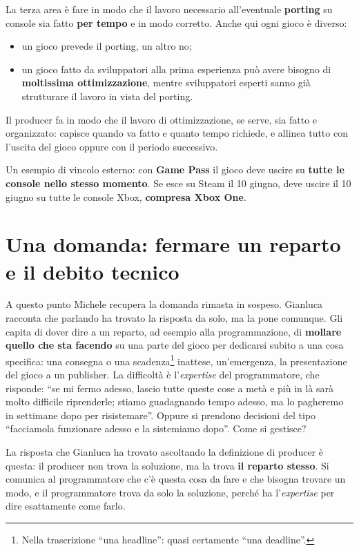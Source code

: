 La terza area è fare in modo che il lavoro necessario all'eventuale
\textbf{porting} su console sia fatto \textbf{per tempo} e in modo corretto.
Anche qui ogni gioco è diverso:
\begin{itemize}
  \item un gioco prevede il porting, un altro no;
  \item un gioco fatto da sviluppatori alla prima esperienza può avere bisogno
        di \textbf{moltissima ottimizzazione}, mentre sviluppatori esperti
        sanno già strutturare il lavoro in vista del porting.
\end{itemize}
Il producer fa in modo che il lavoro di ottimizzazione, se serve, sia fatto e
organizzato: capisce quando va fatto e quanto tempo richiede, e allinea tutto
con l'uscita del gioco oppure con il periodo successivo.

Un esempio di vincolo esterno: con \textbf{Game Pass} il gioco deve uscire su
\textbf{tutte le console nello stesso momento}. Se esce su Steam il 10 giugno,
deve uscire il 10 giugno su tutte le console Xbox, \textbf{compresa Xbox One}.

\section{Una domanda: fermare un reparto e il debito tecnico}
\label{sec:z4-qa-debito}

A questo punto Michele recupera la domanda rimasta in sospeso. Gianluca
racconta che parlando ha trovato la risposta da solo, ma la pone comunque.
Gli capita di dover dire a un reparto, ad esempio alla programmazione, di
\textbf{mollare quello che sta facendo} su una parte del gioco per dedicarsi
subito a una cosa specifica: una consegna o una scadenza\footnote{Nella
trascrizione ``una headline'': quasi certamente ``una deadline''.} inattese,
un'emergenza, la presentazione del gioco a un publisher. La difficoltà è
l'\emph{expertise} del programmatore, che risponde: ``se mi fermo adesso, lascio
tutte queste cose a metà e più in là sarà molto difficile riprenderle; stiamo
guadagnando tempo adesso, ma lo pagheremo in settimane dopo per risistemare''.
Oppure si prendono decisioni del tipo ``facciamola funzionare adesso e la
sistemiamo dopo''. Come si gestisce?

La risposta che Gianluca ha trovato ascoltando la definizione di producer è
questa: il producer non trova la soluzione, ma la trova \textbf{il reparto
stesso}. Si comunica al programmatore che c'è questa cosa da fare e che bisogna
trovare un modo, e il programmatore trova da solo la soluzione, perché ha
l'\emph{expertise} per dire esattamente come farlo.

